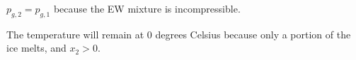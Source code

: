 \( p_{g,2} = p_{g,1} \) because the EW mixture is incompressible.  

The temperature will remain at 0 degrees Celsius because only a portion of the ice melts, and \( x_2 > 0 \).